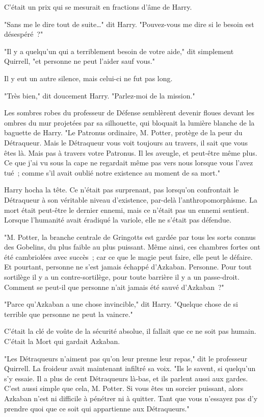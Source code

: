 C'était un prix qui se mesurait en fractions d'âme de Harry.

"Sans me le dire tout de suite…" dit Harry. "Pouvez-vous me dire si le besoin est désespéré~?"

"Il y a quelqu'un qui a terriblement besoin de votre aide," dit simplement Quirrell, "et personne ne peut l'aider sauf vous."

Il y eut un autre silence, mais celui-ci ne fut pas long.

"Très bien," dit doucement Harry. "Parlez-moi de la mission."

Les sombres robes du professeur de Défense semblèrent devenir floues devant les ombres du mur projetées par sa silhouette, qui bloquait la lumière blanche de la baguette de Harry. "Le Patronus ordinaire, M. Potter, protège de la peur du Détraqueur. Mais le Détraqueur vous voit toujours au travers, il sait que vous êtes là. Mais pas à travers votre Patronus. Il les aveugle, et peut-être même plus. Ce que j'ai vu sous la cape ne regardait même pas vers nous lorsque vous l'avez tué~; comme s'il avait oublié notre existence au moment de sa mort."

Harry hocha la tête. Ce n'était pas surprenant, pas lorsqu'on confrontait le Détraqueur à son véritable niveau d'existence, par-delà l'anthropomorphisme. La mort était peut-être le dernier ennemi, mais ce n'était pas un ennemi sentient. Lorsque l'humanité avait éradiqué la variole, elle ne s'était pas défendue.

"M. Potter, la branche centrale de Gringotts est gardée par tous les sorts connus des Gobelins, du plus faible au plus puissant. Même ainsi, ces chambres fortes ont été cambriolées avec succès~; car ce que le magie peut faire, elle peut le défaire. Et pourtant, personne ne s'est jamais échappé d'Azkaban. Personne. Pour tout sortilège il y a un contre-sortilège, pour toute barrière il y a un passe-droit. Comment se peut-il que personne n'ait jamais été sauvé d'Azkaban~?"

"Parce qu'Azkaban a une chose invincible," dit Harry. "Quelque chose de si terrible que personne ne peut la vaincre."

C'était la clé de voûte de la sécurité absolue, il fallait que ce ne soit pas humain. C'était la Mort qui gardait Azkaban.

"Les Détraqueurs n'aiment pas qu'on leur prenne leur repas," dit le professeur Quirrell. La froideur avait maintenant infiltré sa voix. "Ils le savent, si quelqu'un s'y essaie. Il a plus de cent Détraqueurs là-bas, et ils parlent aussi aux gardes. C'est aussi simple que cela, M. Potter. Si vous êtes un sorcier puissant, alors Azkaban n'est ni difficile à pénétrer ni à quitter. Tant que vous n'essayez pas d'y prendre quoi que ce soit qui appartienne aux Détraqueurs."

